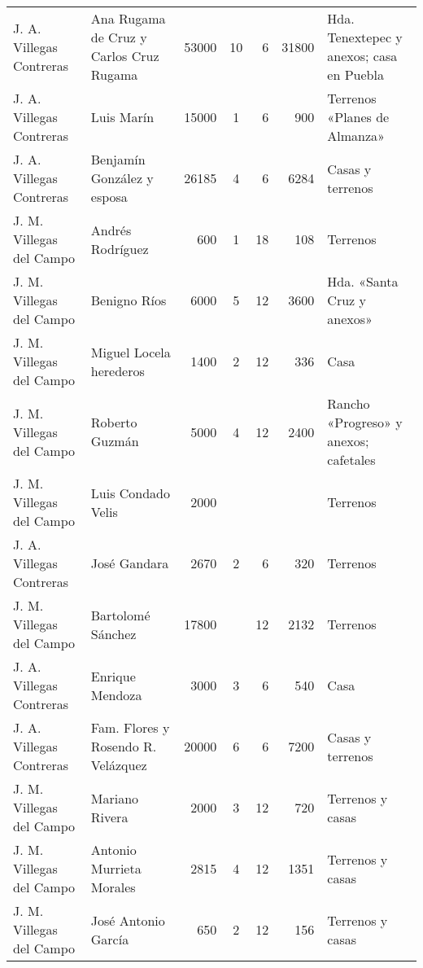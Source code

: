 \documentclass[14pt,twoside,final]{extbook} %
\begin{document}
{\begin{longtable}[c]{@{}p{2.5cm}lrSrrl@{}}
J. A. Villegas Contreras & Ana Rugama de Cruz y Carlos Cruz Rugama & 53000 & 10 & 6 & 31800 & Hda. Tenextepec y anexos; casa en Puebla \\
J. A. Villegas Contreras & Luis Marín & 15000 & 1 & 6 & 900 & Terrenos «Planes de Almanza» \\
J. A. Villegas Contreras & Benjamín González y esposa & 26185 & 4 & 6 & 6284 & Casas y terrenos \\
J. M. Villegas del Campo & Andrés Rodríguez & 600 & 1 & 18 & 108 & Terrenos \\
J. M. Villegas del Campo & Benigno Ríos & 6000 & 5 & 12 & 3600 & Hda. «Santa Cruz y anexos» \\
J. M. Villegas del Campo & Miguel Locela herederos & 1400 & 2 & 12 & 336 & Casa \\
J. M. Villegas del Campo & Roberto Guzmán & 5000 & 4 & 12 & 2400 & Rancho «Progreso» y anexos; cafetales \\
J. M. Villegas del Campo & Luis Condado Velis & 2000 & {} & {} & {} & Terrenos \\
J. A. Villegas Contreras & José Gandara & 2670 & 2 & 6 & 320 & Terrenos \\
J. M. Villegas del Campo & Bartolomé Sánchez & 17800 & {} & 12 & 2132 & Terrenos \\
J. A. Villegas Contreras & Enrique Mendoza & 3000 & 3 & 6 & 540 & Casa \\
J. A. Villegas Contreras & Fam. Flores y Rosendo R. Velázquez & 20000 & 6 & 6 & 7200 & Casas y terrenos \\
J. M. Villegas del Campo & Mariano Rivera & 2000 & 3 & 12 & 720 & Terrenos y casas \\
J. M. Villegas del Campo & Antonio Murrieta Morales & 2815 & 4 & 12 & 1351 & Terrenos y casas \\
J. M. Villegas del Campo & José Antonio García & 650 & 2 & 12 & 156 & Terrenos y casas \\

\end{longtable}}
\end{document}
